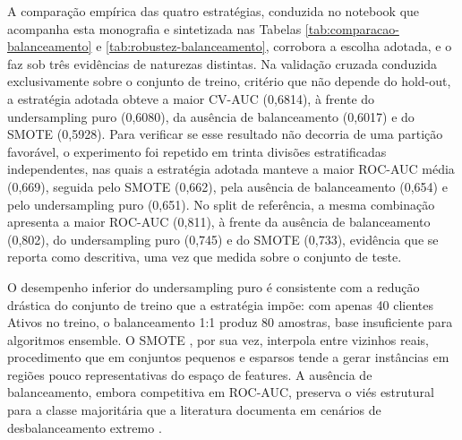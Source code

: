 A comparação empírica das quatro estratégias, conduzida no notebook que acompanha esta monografia e sintetizada nas Tabelas \ref{tab:comparacao-balanceamento} e \ref{tab:robustez-balanceamento}, corrobora a escolha adotada, e o faz sob três evidências de naturezas distintas. Na validação cruzada conduzida exclusivamente sobre o conjunto de treino, critério que não depende do hold-out, a estratégia adotada obteve a maior CV-AUC (0,6814), à frente do undersampling puro (0,6080), da ausência de balanceamento (0,6017) e do SMOTE (0,5928). Para verificar se esse resultado não decorria de uma partição favorável, o experimento foi repetido em trinta divisões estratificadas independentes, nas quais a estratégia adotada manteve a maior ROC-AUC média (0,669), seguida pelo SMOTE (0,662), pela ausência de balanceamento (0,654) e pelo undersampling puro (0,651). No split de referência, a mesma combinação apresenta a maior ROC-AUC (0,811), à frente da ausência de balanceamento (0,802), do undersampling puro (0,745) e do SMOTE (0,733), evidência que se reporta como descritiva, uma vez que medida sobre o conjunto de teste.

O desempenho inferior do undersampling puro é consistente com a redução drástica do conjunto de treino que a estratégia impõe: com apenas 40 clientes Ativos no treino, o balanceamento 1:1 produz 80 amostras, base insuficiente para algoritmos ensemble. O SMOTE \cite{chawla2002}, por sua vez, interpola entre vizinhos reais, procedimento que em conjuntos pequenos e esparsos tende a gerar instâncias em regiões pouco representativas do espaço de features. A ausência de balanceamento, embora competitiva em ROC-AUC, preserva o viés estrutural para a classe majoritária que a literatura documenta em cenários de desbalanceamento extremo \cite{he2009}.

